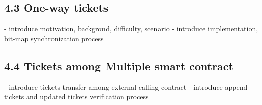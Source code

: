 \subsection*{4.3 One-way tickets}
- introduce motivation, backgroud, difficulty, scenario
- introduce implementation, bit-map synchronization process

\subsection*{4.4 Tickets among Multiple smart contract}
- introduce tickets transfer among external calling contract
- introduce append tickets and updated tickets verification process



